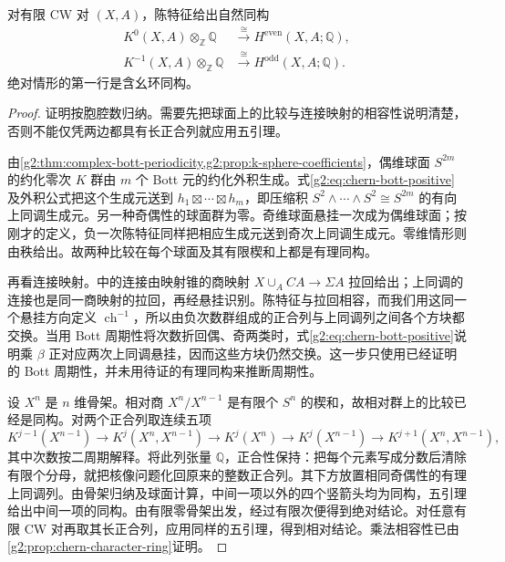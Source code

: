 \begin{theorem}\label{g2:thm:rational-chern-character}
	对有限 CW 对 \((X,A)\)，陈特征给出自然同构
	\[
	\begin{aligned}
		K^0(X,A)\otimes_{\mathbb Z}\mathbb Q&\xrightarrow{\cong}H^{\mathrm{even}}(X,A;\mathbb Q),\\
		K^{-1}(X,A)\otimes_{\mathbb Z}\mathbb Q&\xrightarrow{\cong}H^{\mathrm{odd}}(X,A;\mathbb Q).
	\end{aligned}
	\]
	绝对情形的第一行是含幺环同构。
\end{theorem}
\begin{proof}
	证明按胞腔数归纳。需要先把球面上的比较与连接映射的相容性说明清楚，否则不能仅凭两边都具有长正合列就应用五引理。

	由\cref{g2:thm:complex-bott-periodicity,g2:prop:k-sphere-coefficients}，偶维球面 \(S^{2m}\) 的约化零次 \(K\) 群由 \(m\) 个 Bott 元的约化外积生成。式\eqref{g2:eq:chern-bott-positive}及外积公式把这个生成元送到 \(h_1\boxtimes\cdots\boxtimes h_m\)，即压缩积 \(S^2\wedge\cdots\wedge S^2\cong S^{2m}\) 的有向上同调生成元。另一种奇偶性的球面群为零。奇维球面悬挂一次成为偶维球面；按刚才的定义，负一次陈特征同样把相应生成元送到奇次上同调生成元。零维情形则由秩给出。故两种比较在每个球面及其有限楔和上都是有理同构。

	再看连接映射。中的连接由映射锥的商映射 \(X\cup_A CA\to\Sigma A\) 拉回给出；上同调的连接也是同一商映射的拉回，再经悬挂识别。陈特征与拉回相容，而我们用这同一个悬挂方向定义 \(\operatorname{ch}^{-1}\)，所以由负次数群组成的正合列与上同调列之间各个方块都交换。当用 Bott 周期性将次数折回偶、奇两类时，式\eqref{g2:eq:chern-bott-positive}说明乘 \(\beta\) 正对应两次上同调悬挂，因而这些方块仍然交换。这一步只使用已经证明的 Bott 周期性，并未用待证的有理同构来推断周期性。

	设 \(X^n\) 是 \(n\) 维骨架。相对商 \(X^n/X^{n-1}\) 是有限个 \(S^n\) 的楔和，故相对群上的比较已经是同构。对两个正合列取连续五项
	\[
		K^{j-1}(X^{n-1})\longrightarrow K^j(X^n,X^{n-1})
		\longrightarrow K^j(X^n)\longrightarrow K^j(X^{n-1})
		\longrightarrow K^{j+1}(X^n,X^{n-1}),
	\]
	其中次数按二周期解释。将此列张量 \(\mathbb Q\)，正合性保持：把每个元素写成分数后清除有限个分母，就把核像问题化回原来的整数正合列。其下方放置相同奇偶性的有理上同调列。由骨架归纳及球面计算，中间一项以外的四个竖箭头均为同构，五引理给出中间一项的同构。由有限零骨架出发，经过有限次便得到绝对结论。对任意有限 CW 对再取其长正合列，应用同样的五引理，得到相对结论。乘法相容性已由\cref{g2:prop:chern-character-ring}证明。
\end{proof}

